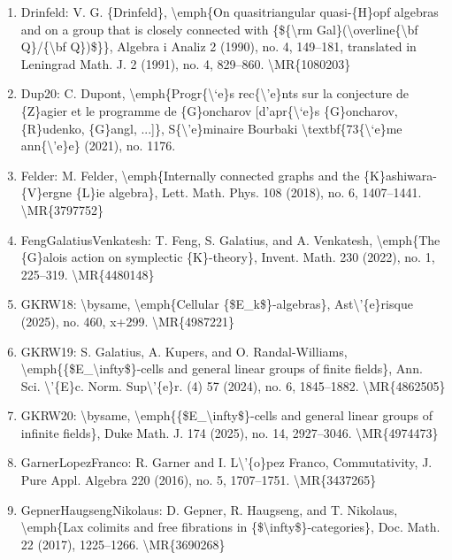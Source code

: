 \documentclass[11pt]{article}
\begin{document}
\begin{enumerate}[leftmargin=*]
  \item Drinfeld: V. G. \{Drinfeld\}, \textbackslash{}emph\{On quasitriangular quasi-\{H\}opf algebras and on a group that is closely connected with \{\$\{\textbackslash{}rm Gal\}(\textbackslash{}overline\{\textbackslash{}bf Q\}/\{\textbackslash{}bf Q\})\$\}\}, Algebra i Analiz 2 (1990), no. 4, 149--181, translated in Leningrad Math. J. 2 (1991), no. 4, 829--860. \textbackslash{}MR\{1080203\}
  \item Dup20: C. Dupont, \textbackslash{}emph\{Progr\{\textbackslash{}`e\}s rec\{\textbackslash{}'e\}nts sur la conjecture de \{Z\}agier et le programme de \{G\}oncharov [d'apr\{\textbackslash{}`e\}s \{G\}oncharov, \{R\}udenko, \{G\}angl, ...]\}, S\{\textbackslash{}'e\}minaire Bourbaki \textbackslash{}textbf\{73\{\textbackslash{}`e\}me ann\{\textbackslash{}'e\}e\} (2021), no. 1176.
  \item Felder: M. Felder, \textbackslash{}emph\{Internally connected graphs and the \{K\}ashiwara-\{V\}ergne \{L\}ie algebra\}, Lett. Math. Phys. 108 (2018), no. 6, 1407--1441. \textbackslash{}MR\{3797752\}
  \item FengGalatiusVenkatesh: T. Feng, S. Galatius, and A. Venkatesh, \textbackslash{}emph\{The \{G\}alois action on symplectic \{K\}-theory\}, Invent. Math. 230 (2022), no. 1, 225--319. \textbackslash{}MR\{4480148\}
  \item GKRW18: \textbackslash{}bysame, \textbackslash{}emph\{Cellular \{\$E\_k\$\}-algebras\}, Ast\textbackslash{}'\{e\}risque (2025), no. 460, x+299. \textbackslash{}MR\{4987221\}
  \item GKRW19: S. Galatius, A. Kupers, and O. Randal-Williams, \textbackslash{}emph\{\{\$E\_\textbackslash{}infty\$\}-cells and general linear groups of finite fields\}, Ann. Sci. \textbackslash{}'\{E\}c. Norm. Sup\textbackslash{}'\{e\}r. (4) 57 (2024), no. 6, 1845--1882. \textbackslash{}MR\{4862505\}
  \item GKRW20: \textbackslash{}bysame, \textbackslash{}emph\{\{\$E\_\textbackslash{}infty\$\}-cells and general linear groups of infinite fields\}, Duke Math. J. 174 (2025), no. 14, 2927--3046. \textbackslash{}MR\{4974473\}
  \item GarnerLopezFranco: R. Garner and I. L\textbackslash{}'\{o\}pez Franco, Commutativity, J. Pure Appl. Algebra 220 (2016), no. 5, 1707--1751. \textbackslash{}MR\{3437265\}
  \item GepnerHaugsengNikolaus: D. Gepner, R. Haugseng, and T. Nikolaus, \textbackslash{}emph\{Lax colimits and free fibrations in \{\$\textbackslash{}infty\$\}-categories\}, Doc. Math. 22 (2017), 1225--1266. \textbackslash{}MR\{3690268\}

\end{enumerate}
\end{document}
